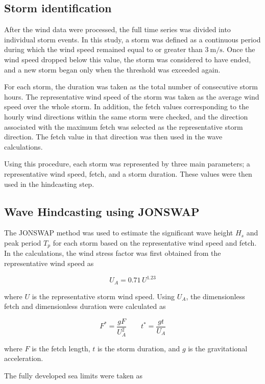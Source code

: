 \documentclass[a4paper, 11pt]{article}
\begin{document}
\subsection{Storm identification}

\hspace*{0.5cm}After the wind data were processed, the full time series was divided into individual storm events. In this study, a storm was defined as a continuous period during which the wind speed remained equal to or greater than \(3\ \mathrm{m/s}\). Once the wind speed dropped below this value, the storm was considered to have ended, and a new storm began only when the threshold was exceeded again.

For each storm, the duration was taken as the total number of consecutive storm hours. The representative wind speed of the storm was taken as the average wind speed over the whole storm. In addition, the fetch values corresponding to the hourly wind directions within the same storm were checked, and the direction associated with the maximum fetch was selected as the representative storm direction. The fetch value in that direction was then used in the wave calculations.

Using this procedure, each storm was represented by three main parameters; a representative wind speed, fetch, and a storm duration. These values were then used in the hindcasting step.

\subsection{Wave Hindcasting using JONSWAP}

\hspace*{0.5cm}The JONSWAP method was used to estimate the significant wave height \(H_s\) and peak period \(T_p\) for each storm based on the representative wind speed and fetch. In the calculations, the wind stress factor was first obtained from the representative wind speed as

\[
U_A = 0.71\,U^{1.23}
\]

where \(U\) is the representative storm wind speed. Using \(U_A\), the dimensionless fetch and dimensionless duration were calculated as

\[
F^*=\frac{gF}{U_A^2}
\qquad
t^*=\frac{gt}{U_A}
\]

where \(F\) is the fetch length, \(t\) is the storm duration, and \(g\) is the gravitational acceleration.

The fully developed sea limits were taken as
\end{document}
